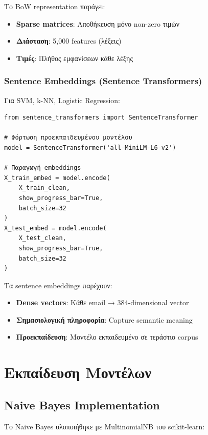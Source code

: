 \documentclass[12pt,a4paper,twoside]{book}
\begin{document}
Το BoW representation παράγει:
\begin{itemize}
    \item \textbf{Sparse matrices}: Αποθήκευση μόνο non-zero τιμών
    \item \textbf{Διάσταση}: 5,000 features (λέξεις)
    \item \textbf{Τιμές}: Πλήθος εμφανίσεων κάθε λέξης
\end{itemize}

\subsubsection{Sentence Embeddings (Sentence Transformers)}

Για SVM, k-NN, Logistic Regression:

\begin{tcolorbox}[myCustomStyle={Sentence Embeddings Generation}]
    \begin{lstlisting}[style=myPythonStyle]
from sentence_transformers import SentenceTransformer

# Φόρτωση προεκπαιδευμένου μοντέλου
model = SentenceTransformer('all-MiniLM-L6-v2')

# Παραγωγή embeddings
X_train_embed = model.encode(
    X_train_clean,
    show_progress_bar=True,
    batch_size=32
)
X_test_embed = model.encode(
    X_test_clean,
    show_progress_bar=True,
    batch_size=32
)
\end{lstlisting}
\end{tcolorbox}

Τα sentence embeddings παρέχουν:
\begin{itemize}
    \item \textbf{Dense vectors}: Κάθε email → 384-dimensional vector
    \item \textbf{Σημασιολογική πληροφορία}: Capture semantic meaning
    \item \textbf{Προεκπαίδευση}: Μοντέλο εκπαιδευμένο σε τεράστιο corpus
\end{itemize}

\section{Εκπαίδευση Μοντέλων}

\subsection{Naive Bayes Implementation}

Το Naive Bayes υλοποιήθηκε με MultinomialNB του scikit-learn:
\end{document}
